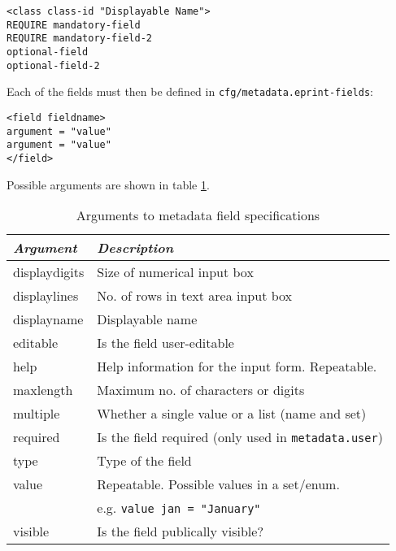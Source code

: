 {\begin{verbatim}
<class class-id "Displayable Name">
REQUIRE mandatory-field
REQUIRE mandatory-field-2
optional-field
optional-field-2
\end{verbatim}

Each of the fields must then be defined in {\tt cfg/metadata.eprint-fields}:

\begin{verbatim}
<field fieldname>
argument = "value"
argument = "value"
</field>
\end{verbatim}

Possible arguments are shown in table \ref{install_meta_args}.

\begin{table}
\begin{center}
\begin{tabular}{|l|l|}
\hline
\emph{Argument} & \emph{Description}                                       \\
\hline
displaydigits   & Size of numerical input box                              \\
displaylines    & No. of rows in text area input box                       \\
displayname     & Displayable name                                         \\
editable        & Is the field user-editable                               \\
help            & Help information for the input form. Repeatable.         \\
maxlength       & Maximum no. of characters or digits                      \\
multiple        & Whether a single value or a list (name and set)          \\
required        & Is the field required (only used in {\tt metadata.user}) \\
type            & Type of the field                                        \\
value           & Repeatable. Possible values in a set/enum.               \\
                & e.g. {\tt value jan = "January"}                         \\
visible         & Is the field publically visible?                         \\
\hline
\end{tabular}
\caption{\label{install_meta_args} Arguments to metadata field specifications}
\end{center}
\end{table}

}
